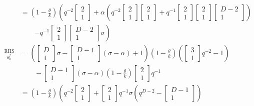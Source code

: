 \documentclass[
]{book}
\theoremstyle{definition}
\theoremstyle{definition}
\theoremstyle{definition}
\theoremstyle{definition}
\theoremstyle{remark}
\begin{document}
\begin{align}
& = \left(1-\frac{\theta}{k}\right)\left(q^{-2}\begin{bmatrix}{2}\\{1}\end{bmatrix}+\alpha\left(q^{-2}\begin{bmatrix}{2}\\{1}\end{bmatrix}\begin{bmatrix}{2}\\{1}\end{bmatrix}+q^{-1}\begin{bmatrix}{2}\\{1}\end{bmatrix}\begin{bmatrix}{2}\\{1}\end{bmatrix}\begin{bmatrix}{D-2}\\{1}\end{bmatrix}\right)\right.\\
& \qquad \left.-q^{-1}\begin{bmatrix}{2}\\{1}\end{bmatrix}\begin{bmatrix}{D-2}\\{1}\end{bmatrix}\sigma\right)\\
\frac{\mathrm{RHS}}{\theta^*_0} & = \left(\begin{bmatrix}{D}\\{1}\end{bmatrix}\sigma-\begin{bmatrix}{D-1}\\{1}\end{bmatrix}(\sigma-\alpha)+1\right)\left(1-\frac{\theta}{k}\right)\left(\begin{bmatrix}{3}\\{1}\end{bmatrix}q^{-2}-1\right)\\
& \qquad -\begin{bmatrix}{D-1}\\{1}\end{bmatrix}(\sigma-\alpha)\left(1-\frac{\theta}{k}\right)\begin{bmatrix}{2}\\{1}\end{bmatrix}q^{-1}\\
& = \left(1-\frac{\theta}{k}\right)\left(q^{-2}\begin{bmatrix}{2}\\{1}\end{bmatrix}+\begin{bmatrix}{2}\\{1}\end{bmatrix}q^{-1}\sigma\left(q^{D-2}-\begin{bmatrix}{D-1}\\{1}\end{bmatrix}\right)\right.\\

\end{align}
\end{document}
